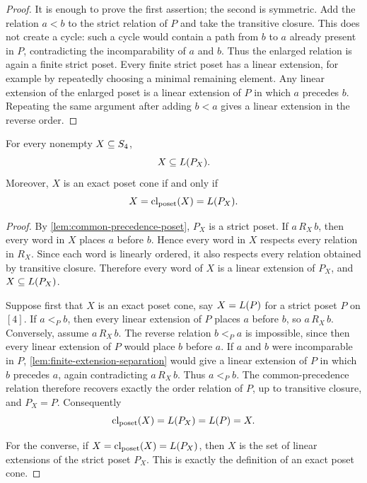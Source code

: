 \begin{proof}
It is enough to prove the first assertion; the second is symmetric. Add the relation \(a<b\) to the strict relation of \(P\) and take the transitive closure. This does not create a cycle: such a cycle would contain a path from \(b\) to \(a\) already present in \(P\), contradicting the incomparability of \(a\) and \(b\). Thus the enlarged relation is again a finite strict poset. Every finite strict poset has a linear extension, for example by repeatedly choosing a minimal remaining element. Any linear extension of the enlarged poset is a linear extension of \(P\) in which \(a\) precedes \(b\). Repeating the same argument after adding \(b<a\) gives a linear extension in the reverse order.
\end{proof}

\begin{theorem}
\label{prop:common-precedence-exactness}
For every nonempty \(X\subseteq S_4\),
\[
  X\subseteq L(P_X).
\]
Moreover, \(X\) is an exact poset cone if and only if
\[
  X=\operatorname{cl}_{\mathrm{poset}}(X)=L(P_X).
\]
\end{theorem}

\begin{proof}
By \cref{lem:common-precedence-poset}, \(P_X\) is a strict poset. If \(a\,R_X\,b\), then every word in \(X\) places \(a\) before \(b\). Hence every word in \(X\) respects every relation in \(R_X\). Since each word is linearly ordered, it also respects every relation obtained by transitive closure. Therefore every word of \(X\) is a linear extension of \(P_X\), and \(X\subseteq L(P_X)\).

Suppose first that \(X\) is an exact poset cone, say \(X=L(P)\) for a strict poset \(P\) on \([4]\). If \(a<_P b\), then every linear extension of \(P\) places \(a\) before \(b\), so \(a\,R_X\,b\). Conversely, assume \(a\,R_X\,b\). The reverse relation \(b<_P a\) is impossible, since then every linear extension of \(P\) would place \(b\) before \(a\). If \(a\) and \(b\) were incomparable in \(P\), \cref{lem:finite-extension-separation} would give a linear extension of \(P\) in which \(b\) precedes \(a\), again contradicting \(a\,R_X\,b\). Thus \(a<_P b\). The common-precedence relation therefore recovers exactly the order relation of \(P\), up to transitive closure, and \(P_X=P\). Consequently
\[
  \operatorname{cl}_{\mathrm{poset}}(X)=L(P_X)=L(P)=X.
\]

For the converse, if \(X=\operatorname{cl}_{\mathrm{poset}}(X)=L(P_X)\), then \(X\) is the set of linear extensions of the strict poset \(P_X\). This is exactly the definition of an exact poset cone.
\end{proof}